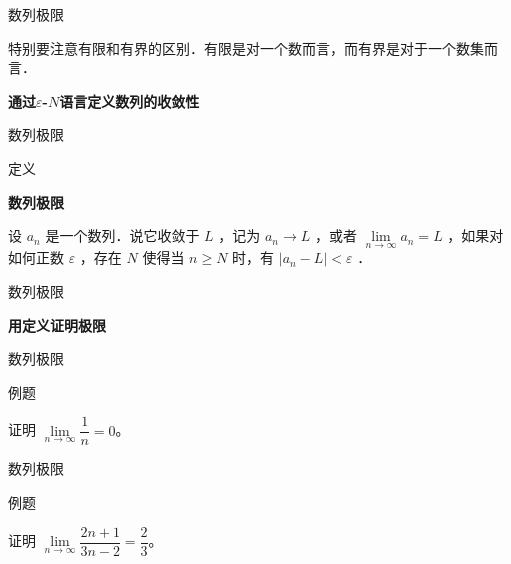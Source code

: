 \documentclass[aspectratio=169,10pt,fontset=fandol]{ctexbeamer}
\newenvironment{custom}[1]{\par\noindent\textbf{#1}\quad}{\par\vspace{0.8em}}
\begin{document}
\begin{frame}[t,fragile]{数列极限}
\normalsize
{\normalsize
特别要注意有限和有界的区别．有限是对一个数而言，而有界是对于一个数集而言．


}
{\normalsize

\textbf{通过\texorpdfstring{\(\varepsilon\)-\(N\)语言定义数列的收敛性}{epsilon-N 定义}}


}
\end{frame}
\begin{frame}[t,fragile]{数列极限}
\normalsize
\begin{block}{定义}
{\normalsize
\textbf{数列极限}\par

设 $a_n$ 是一个数列．说它收敛于 $L$ ，记为 $a_n \rightarrow L$ ，或者 $\lim \limits_{n \to \infty} a_n=L$ ，如果对如何正数 $\varepsilon$ ，存在 $N$ 使得当 $n \geqslant N$ 时，有 $\left|a_n-L\right|<\varepsilon$ ．

}
\end{block}
\end{frame}
\begin{frame}[t,fragile]{数列极限}
\normalsize
{\normalsize
\textbf{用定义证明极限}


}
\end{frame}
\begin{frame}[t,fragile]{数列极限}
\normalsize
\begin{block}{例题}
{\normalsize
证明 \(\lim\limits_{n\to\infty} \dfrac{1}{n} = 0\)。

}
\end{block}
\end{frame}
\begin{frame}[t,fragile]{数列极限}
\normalsize
\begin{block}{例题}
{\normalsize
证明 \(\lim\limits_{n\to\infty} \dfrac{2n+1}{3n-2} = \dfrac{2}{3}\)。

}
\end{block}
\end{frame}
\end{document}
